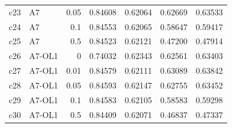 \begin{tabular}{@{}llrrrrr@{}}
c23 & A7 & 0.05 & 0.84608 & 0.62064 & 0.62669 & 0.63533 \\
c24 & A7 & 0.1 & 0.84553 & 0.62065 & 0.58647 & 0.59417 \\
c25 & A7 & 0.5 & 0.84523 & 0.62121 & 0.47200 & 0.47914 \\
\addlinespace[2pt]
c26 & A7-OL1 & 0 & 0.74032 & 0.62343 & 0.62561 & 0.63403 \\
c27 & A7-OL1 & 0.01 & 0.84579 & 0.62111 & 0.63089 & 0.63842 \\
c28 & A7-OL1 & 0.05 & 0.84593 & 0.62147 & 0.62755 & 0.63452 \\
c29 & A7-OL1 & 0.1 & 0.84583 & 0.62105 & 0.58583 & 0.59298 \\
c30 & A7-OL1 & 0.5 & 0.84409 & 0.62071 & 0.46837 & 0.47337 \\
\bottomrule
\end{tabular}

